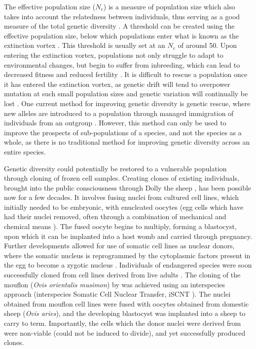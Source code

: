 \documentclass[12pt]{article}
\begin{document}
	The effective population size ($N_e$) is a measure of
	population size which also takes into account the relatedness between
	individuals, thus serving as a good measure of the total genetic diversity
	\citep{frankhamEffectivePopulationSize1995}.
	A threshold can be created
	using the effective population size, below which populations enter
	what is known as the extinction vortex \citep{harmonConservationSmallPopulations2010}. This threshold is usually set at an $N_e$ of
	around 50. Upon entering the extinction vortex, populations not only struggle to
	adapt to environmental changes, but begin to suffer from
	inbreeding, which can lead to decreased fitness and reduced fertility
	\citep{nabutanyiModelsEcoEvolutionaryExtinction2021}. It is
	difficult to rescue a population once it has entered the extinction vortex, as genetic
	drift will tend to overpower mutation at such small population sizes and genetic
	variation will continually be lost \citep{harmonConservationSmallPopulations2010}.
	One current method for improving genetic diversity is genetic rescue,
	where new alleles are introduced to a population through managed immigration
	of individuals from an outgroup
	\citep{whiteleyGeneticRescueRescue2015}. However, this method can only be used to
	improve the prospects of sub-populations of a species, and not the species as a
	whole, as there is no traditional method for improving genetic diversity across
	an entire species.
	
	Genetic diversity could potentially be restored to a vulnerable
	population through cloning of frozen cell samples. Creating clones of existing
	individuals, brought into the public consciousness through Dolly the sheep
	\citep{campbellSheepClonedNuclear1996}, has been possible now for a few decades.
	It involves fusing nuclei from cultured cell lines, which initially needed to be
	embryonic, with enucleated
	oocytes (egg cells which have had their nuclei removed, often
	through a combination of mechanical and chemical means
	\citep{vajtaHighlyEfficientReliable2006}).
	The fused oocyte begins to 
	multiply, forming a blastocyst, upon which it can be implanted into a host
	womb and carried through pregnancy. Further developments allowed for
	use of somatic cell lines as nuclear donors, where the somatic
	nucleus is reprogrammed by the cytoplasmic factors present in the egg
	to become a zygotic nucleus \citep{shapiroPathwaysDeextinctionHow2017}.
	Individuals of endangered
	species were soon successfully cloned from cell lines derived from live
	adults \citep{loiGeneticRescueEndangered2001}. The cloning of the mouflon
	(\textit{Ovis orientalis musimon}) by \citet{loiGeneticRescueEndangered2001}
	was achieved using an interspecies
	approach (interspecies Somatic Cell Nuclear Transfer, iSCNT
	\citep{wiselyRoadMap21st2015}). The nuclei obtained from mouflon cell lines were
	fused
	with oocytes obtained from domestic sheep 
	(\textit{Ovis aries}), and the developing blastocyst was implanted into a sheep
	to carry to term. Importantly, the cells which the donor nuclei were
	derived from were non-viable (could not be induced to divide),
	and yet successfully
	produced clones.
	
\end{document}
